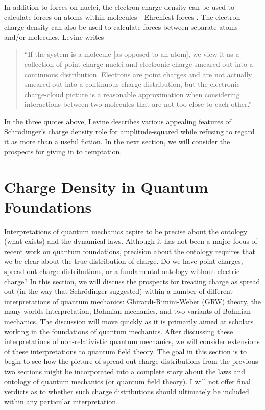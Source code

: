 \documentclass[onecolumn,secnumarabic,amsmath,amssymb,balancelastpage,nofootinbib]{article}
\begin{document}
In addition to forces on nuclei, the electron charge density can be used to calculate forces on atoms within molecules---Ehrenfest forces \cite{bader1990, bader2005, bader2013}.  The electron charge density can also be used to calculate forces between separate atoms and/or molecules.  Levine \cite[pg.\ 460]{levineQC} writes
\begin{quote}
``If the system is a molecule [as opposed to an atom], we view it as a collection of point-charge nuclei and electronic charge smeared out into a continuous distribution.  Electrons are point charges and are not actually smeared out into a continuous charge distribution, but the electronic-charge-cloud picture is a reasonable approximation when considering interactions between two molecules that are not too close to each other.''
\end{quote}
In the three quotes above, Levine describes various appealing features of Schr\"{o}dinger's charge density role for amplitude-squared while refusing to regard it as more than a useful fiction.  In the next section, we will consider the prospects for giving in to temptation.











\section{Charge Density in Quantum Foundations}\label{QFsection}

Interpretations of quantum mechanics aspire to be precise about the ontology (what exists) and the dynamical laws.  Although it has not been a major focus of recent work on quantum foundations, precision about the ontology requires that we be clear about the true distribution of charge.  Do we have point charges, spread-out charge distributions, or a fundamental ontology without electric charge?  In this section, we will discuss the prospects for treating charge as spread out (in the way that Schr\"{o}dinger suggested) within a number of different interpretations of quantum mechanics: Ghirardi-Rimini-Weber (GRW) theory, the many-worlds interpretation, Bohmian mechanics, and two variants of Bohmian mechanics.  The discussion will move quickly as it is primarily aimed at scholars working in the foundations of quantum mechanics.  After discussing these interpretations of non-relativistic quantum mechanics, we will consider extensions of these interpretations to quantum field theory.  The goal in this section is to begin to see how the picture of spread-out charge distributions from the previous two sections might be incorporated into a complete story about the laws and ontology of quantum mechanics (or quantum field theory).  I will not offer final verdicts as to whether such charge distributions should ultimately be included within any particular interpretation.
\end{document}

